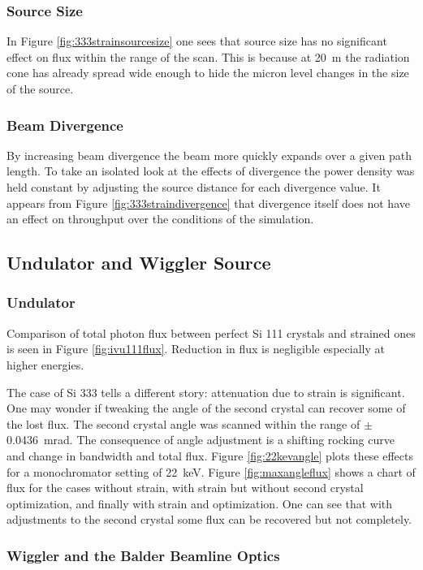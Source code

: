 \documentclass[preprint]{iucr}              %
\begin{document}
\subsubsection{Source Size}
In Figure \ref{fig:333strainsourcesize} one sees that source size has no significant effect on flux within the range of the scan. This is because at 20~m the radiation cone has already spread wide enough to hide the micron level changes in the size of the source.

\subsubsection{Beam Divergence}
By increasing beam divergence the beam more quickly expands over a given path length. To take an isolated look at the effects of divergence the power density was held constant by adjusting the source distance for each divergence value. It appears from Figure \ref{fig:333straindivergence} that divergence itself does not have an effect on throughput over the conditions of the simulation.

\subsection{Undulator and Wiggler Source}\label{undulatorwiggler}

\subsubsection{Undulator}
Comparison of total photon flux between perfect Si 111 crystals and strained ones is seen in Figure \ref{fig:ivu111flux}. Reduction in flux is negligible especially at higher energies.

The case of Si 333 tells a different story: attenuation due to strain is significant. One may wonder if tweaking the angle of the second crystal can recover some of the lost flux. The second crystal angle was scanned within the range of $\pm$ 0.0436~mrad. The consequence of angle adjustment is a shifting rocking curve and change in bandwidth and total flux. Figure \ref{fig:22kevangle} plots these effects for a monochromator setting of 22~keV. Figure \ref{fig:maxangleflux} shows a chart of flux for the cases without strain, with strain but without second crystal optimization, and finally with strain and optimization. One can see that with adjustments to the second crystal some flux can be recovered but not completely.

\subsubsection{Wiggler and the Balder Beamline Optics}
\end{document}
